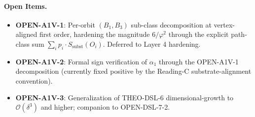 \documentclass[11pt]{article}
\begin{document}
\paragraph{Open Items.}
\begin{itemize}
\item \textbf{OPEN-A1V-1}: Per-orbit $(B_1, B_3)$ sub-class decomposition
at vertex-aligned first order, hardening the magnitude $6/\varphi^2$
through the explicit path-class sum $\sum_i p_i \cdot S_{\text{subst}}(O_i)$.
Deferred to Layer 4 hardening.
\item \textbf{OPEN-A1V-2}: Formal sign verification of $\alpha_1$ through
the OPEN-A1V-1 decomposition (currently fixed positive by the
Reading-C substrate-alignment convention).
\item \textbf{OPEN-A1V-3}: Generalization of THEO-DSL-6 dimensional-growth
to $\mathcal{O}(\delta^3)$ and higher; companion to OPEN-DSL-7-2.
\end{itemize}
\end{document}
